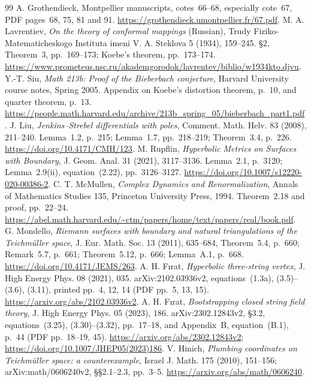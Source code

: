 \documentclass[11pt,a4paper]{article}
\theoremstyle{definition}
\begin{document}
\begin{thebibliography}{99}
\small
{} A. Grothendieck, Montpellier manuscripts, cotes~66--68, especially cote~67, PDF pages~68, 75, 81 and 91. \url{https://grothendieck.umontpellier.fr/67.pdf}.
 M. A. Lavrentiev, \emph{On the theory of conformal mappings} (Russian), Trudy Fiziko-Matematicheskogo Instituta imeni V. A. Steklova 5 (1934), 159--245. \S2, Theorem~3, pp.~169--173; Koebe's theorem, pp.~173--174. \url{https://www.prometeus.nsc.ru/akademgorodok/lavrentev/biblio/w1934kto.djvu}.
 Y.-T. Siu, \emph{Math 213b: Proof of the Bieberbach conjecture}, Harvard University course notes, Spring 2005. Appendix on Koebe's distortion theorem, p.~10, and quarter theorem, p.~13. \url{https://people.math.harvard.edu/archive/213b_spring_05/bieberbach_part1.pdf}.
 J. Liu, \emph{Jenkins--Strebel differentials with poles}, Comment. Math. Helv. 83 (2008), 211--240. Lemma~1.2, p.~215; Lemma~1.7, pp.~218--219; Theorem~3.4, p.~226. \url{https://doi.org/10.4171/CMH/123}.
 M. Rupflin, \emph{Hyperbolic Metrics on Surfaces with Boundary}, J. Geom. Anal. 31 (2021), 3117--3136. Lemma~2.1, p.~3120; Lemma~2.9(ii), equation~(2.22), pp.~3126--3127. \url{https://doi.org/10.1007/s12220-020-00386-2}.
 C. T. McMullen, \emph{Complex Dynamics and Renormalization}, Annals of Mathematics Studies 135, Princeton University Press, 1994. Theorem~2.18 and proof, pp.~22--24. \url{https://abel.math.harvard.edu/~ctm/papers/home/text/papers/real/book.pdf}.
 G. Mondello, \emph{Riemann surfaces with boundary and natural triangulations of the Teichm\"uller space}, J. Eur. Math. Soc. 13 (2011), 635--684, Theorem~5.4, p.~660; Remark~5.7, p.~661; Theorem~5.12, p.~666; Lemma~A.1, p.~668. \url{https://doi.org/10.4171/JEMS/263}.
 A. H. F\i rat, \emph{Hyperbolic three-string vertex}, J. High Energy Phys. 08 (2021), 035. arXiv:2102.03936v2, equations~(1.3a), (3.5)--(3.6), (3.11), printed pp.~4, 12, 14 (PDF pp.~5, 13, 15). \url{https://arxiv.org/abs/2102.03936v2}.
 A. H. F\i rat, \emph{Bootstrapping closed string field theory}, J. High Energy Phys. 05 (2023), 186. arXiv:2302.12843v2, \S3.2, equations~(3.25), (3.30)--(3.32), pp.~17--18, and Appendix~B, equation~(B.1), p.~44 (PDF pp.~18--19, 45). \url{https://arxiv.org/abs/2302.12843v2}; \url{https://doi.org/10.1007/JHEP05(2023)186}.
 V. Hinich, \emph{Plumbing coordinates on Teichm\"uller space: a counterexample}, Israel J. Math. 175 (2010), 151--156; arXiv:math/0606240v2, \S\S2.1--2.3, pp.~3--5. \url{https://arxiv.org/abs/math/0606240}.

\end{thebibliography}
\end{document}
